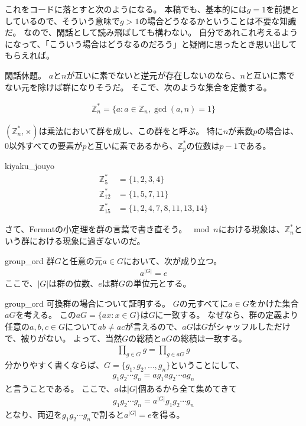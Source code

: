 これをコードに落とすと次のようになる。
本稿でも、基本的には$g=1$を前提としているので、そういう意味で$g>1$の場合どうなるかということは不要な知識だ。
なので、閑話として読み飛ばしても構わない。
自分であれこれ考えるようになって、「こういう場合はどうなるのだろう」と疑問に思ったとき思い出してもらえれば。


閑話休題。
$a$と$n$が互いに素でないと逆元が存在しないのなら、$n$と互いに素でない元を除けば群になりそうだ。
そこで、次のような集合を定義する。

\begin{align*}
\mathbb{Z}_n^* = \{a : a \in \mathbb{Z}_n, \gcd(a,n) = 1\}
\end{align*}

$(\mathbb{Z}_n^*,\times)$は乗法において群を成し、この群をと呼ぶ。
特に$n$が素数$p$の場合は、$0$以外すべての要素が$p$と互いに素であるから、$\mathbb{Z}_p^*$の位数は$p-1$である。

\begin{Exam}{}{kiyaku_jouyo}
\begin{align*}
\mathbb{Z}^*_5 &= \{1, 2, 3, 4\}\\
\mathbb{Z}^*_{12} &= \{1, 5, 7, 11\}\\
\mathbb{Z}^*_{15} &= \{1,2,4,7,8,11,13,14\}
\end{align*}
\end{Exam}

さて、Fermatの小定理を群の言葉で書き直そう。
$\bmod{n}$における現象は、$\mathbb{Z}_n^*$という群における現象に過ぎないのだ。

\begin{Theo}{}{group_ord}
群$G$と任意の元$a\in G$において、次が成り立つ。
\begin{align*}
a^{|G|} = e
\end{align*}
ここで、$|G|$は群の位数、$e$は群$G$の単位元とする。
\end{Theo}

\begin{thProof}{group_ord}
可換群の場合について証明する。
$G$の元すべてに$a\in{G}$をかけた集合$aG$を考える。
この$aG=\{ax:x\in{G}\}$は$G$に一致する。
なぜなら、群の定義より任意の$a,b,c\in{G}$について$ab\neq{ac}$が言えるので、$aG$は$G$がシャッフルしただけで、被りがない。
よって、当然$G$の総積と$aG$の総積は一致する。
\begin{align*}
\prod_{g\in{G}}g = \prod_{g\in{aG}}g
\end{align*}
分かりやすく書くならば、$G=\{g_1,g_2,\ldots,g_n\}$ということにして、
\begin{align*}
g_1g_2\cdots g_n = ag_1 ag_2 \cdots ag_n
\end{align*}
と言うことである。
ここで、$a$は$|G|$個あるから全て集めてきて
\begin{align*}
g_1g_2\cdots g_n = a^{|G|}g_1 g_2 \cdots g_n
\end{align*}
となり、両辺を$g_1g_2\cdots{g_n}$で割ると$a^{|G|}=e$を得る。
\end{thProof}

